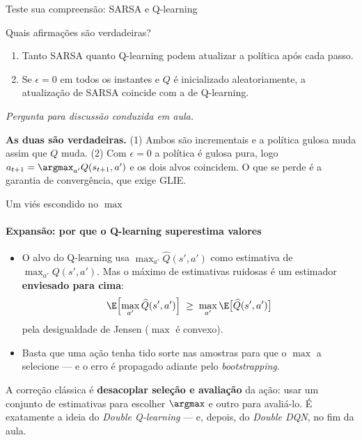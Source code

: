 \documentclass[aspectratio=169, 11pt]{beamer}
\newcommand{\paradiscussao}{\smallskip
  {\footnotesize\color{rlCinza}\itshape Pergunta para discussão conduzida em aula.}}
\newcommand{\Qhat}{\widehat{Q}}
\begin{document}
\begin{frame}{Teste sua compreensão: SARSA e Q-learning}

  \begin{quizbox}{}
    Quais afirmações são verdadeiras?
    \begin{enumerate}\setlength{\itemsep}{0.2ex}
      \item Tanto SARSA quanto Q-learning podem atualizar a política após
        cada passo.
      \item Se $\epsilon = 0$ em todos os instantes e $Q$ é inicializado
        aleatoriamente, a atualização de SARSA coincide com a de Q-learning.
    \end{enumerate}
  \end{quizbox}
  \paradiscussao

  \pause
  \begin{respbox}
    \textbf{As duas são verdadeiras.} (1) Ambos são incrementais e a
    política gulosa muda assim que $Q$ muda. (2) Com $\epsilon = 0$ a
    política é gulosa pura, logo $a_{t+1} = \argmax_{a'} Q(s_{t+1},a')$ e
    os dois alvos coincidem. O que se perde é a garantia de convergência,
    que exige GLIE.
  \end{respbox}
\end{frame}

\begin{frame}{Um viés escondido no $\max$}
  \framesubtitle{Expansão: por que o Q-learning superestima valores}

  \begin{itemize}\setlength{\itemsep}{0.35ex}
    \item O alvo do Q-learning usa $\max_{a'} \Qhat(s',a')$ como estimativa
      de $\max_{a'} Q(s',a')$. Mas o máximo de estimativas ruidosas é um
      estimador \textbf{enviesado para cima}:
      \[ \E\Bigl[\max_{a'} \Qhat(s',a')\Bigr] \;\ge\; \max_{a'} \E\bigl[\Qhat(s',a')\bigr] \]
      pela desigualdade de Jensen ($\max$ é convexo).
    \item Basta que uma ação tenha tido sorte nas amostras para que o
      $\max$ a selecione --- e o erro é propagado adiante pelo
      \emph{bootstrapping}.
  \end{itemize}


  \begin{ideiabox}
    A correção clássica é \textbf{desacoplar seleção e avaliação} da ação:
    usar um conjunto de estimativas para escolher $\argmax$ e outro para
    avaliá-lo. É exatamente a ideia do \emph{Double Q-learning} --- e,
    depois, do \emph{Double DQN}, no fim da aula.
  \end{ideiabox}
\end{frame}
\end{document}
